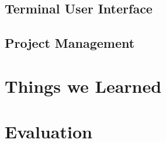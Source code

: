 \documentclass{scrartcl}
\begin{document}
    \subsection{Terminal User Interface} %
    
    \subsection{Project Management} %

  \section{Things we Learned} %
  

  \section{Evaluation} %

  \pagebreak
  
  
\end{document}
